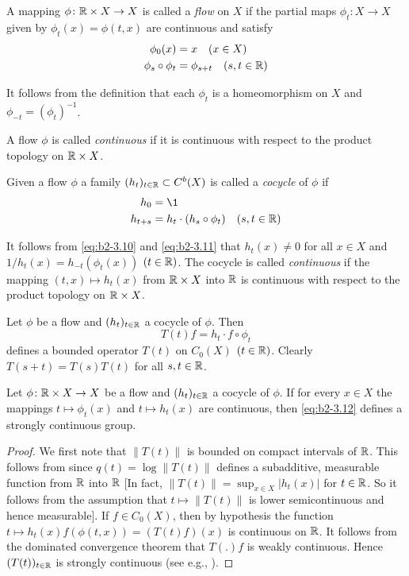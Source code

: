 A mapping $\phi \colon \mathbb{R} \times X \to X$ is called a \emph{flow} on $X$ if the partial maps $\phi_{t} \colon X \to X$ given by $\phi_{t}(x) = \phi(t,x)$ are continuous and satisfy
\begin{align}
\phi_{0}(x) &= x \quad (x \in X) \label{eq:b2-3.8} \\
\phi_{s} \circ \phi_{t} &= \phi_{s+t} \quad (s,t \in \mathbb{R}) \label{eq:b2-3.9}
\end{align}

It follows from the definition that each $\phi_{t}$ is a homeomorphism on $X$ and $\phi_{-t} = (\phi_{t})^{-1}$.

A flow $\phi$ is called \emph{continuous} if it is continuous with respect to the product topology on $\mathbb{R} \times X$.

Given a flow $\phi$ a family $(h_{t})_{t \in \mathbb{R}} \subset C^{b}(X)$ is called a \emph{cocycle} of $\phi$ if
\begin{align}
h_{0} &= \1 \label{eq:b2-3.10} \\
h_{t+s} &= h_{t} \cdot (h_{s} \circ \phi_{t}) \quad (s,t \in \R) \label{eq:b2-3.11}
\end{align}

It follows from \eqref{eq:b2-3.10} and \eqref{eq:b2-3.11} that $h_{t}(x) \neq 0$ for all $x \in X$ and $1/h_{t}(x) = h_{-t}(\phi_{t}(x))$ $(t \in \mathbb{R})$.
The cocycle is called \emph{continuous} if the mapping $(t,x) \mapsto h_{t}(x)$ from $\mathbb{R} \times X$ into $\mathbb{R}$ is continuous with respect to the product topology on $\mathbb{R} \times X$.

Let $\phi$ be a flow and $(h_{t})_{t \in \mathbb{R}}$ a cocycle of $\phi$.
Then
\begin{equation}\label{eq:b2-3.12}
T(t)f = h_{t} \cdot f \circ \phi_{t}
\end{equation}
defines a bounded operator $T(t)$ on $C_{0}(X)$ $(t \in \mathbb{R})$.
Clearly $T(s+t) = T(s)T(t)$ for all $s,t \in \mathbb{R}$.

\begin{proposition}\label{prop:b2-3.8}
Let $\phi \colon \mathbb{R} \times X \to X$ be a flow and $(h_{t})_{t \in \mathbb{R}}$ a cocycle of $\phi$.
If for every $x \in X$ the mappings $t \mapsto \phi_{t}(x)$ and $t \mapsto h_{t}(x)$ are continuous, then \eqref{eq:b2-3.12} defines a strongly continuous group.
\end{proposition}

\begin{proof}
We first note that $\|T(t)\|$ is bounded on compact intervals of $\mathbb{R}$.
This follows from \citet[7.4.1]{hillephillips:1957} since $q(t) = \log\|T(t)\|$ defines a subadditive, measurable function from $\mathbb{R}$ into $\mathbb{R}$ [In fact, $\|T(t)\| = \sup_{x \in X}|h_{t}(x)|$ for $t \in \mathbb{R}$.
So it follows from the assumption that $t \mapsto \|T(t)\|$ is lower semicontinuous and hence measurable].
If $f \in C_{0}(X)$, then by hypothesis the function
$t \mapsto h_{t}(x) f(\phi(t,x)) = (T(t) f) (x)$ is continuous on $\mathbb{R}$.
It follows from the dominated convergence theorem that $T(.)f$ is weakly continuous.
Hence $(T(t))_{t \in \mathbb{R}}$ is strongly continuous (see e.g., \citet[Proposition  1.23]{davies:1980}).
\end{proof}

